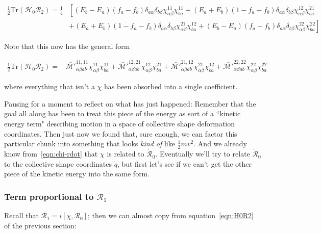 \begin{align}
\frac{1}{2}\mathrm{Tr}\left(\mathcal{H}_0\mathcal{R}_2\right) = \frac{1}{4}
& \left[(E_b-E_a)(f_a-f_b)\delta_{a\alpha}\delta_{b\beta}\chi^{11}_{\alpha\beta}\chi^{11}_{ba} + (E_a+E_b)(1-f_a-f_b)\delta_{a\alpha}\delta_{b\beta}\chi^{12}_{\alpha\beta}\chi^{21}_{ba}\right. \\
&\left.+ (E_a+E_b)(1-f_a-f_b)\delta_{a\alpha}\delta_{b\beta}\chi^{21}_{\alpha\beta}\chi^{12}_{ba} + (E_b-E_a)(f_a-f_b)\delta_{a\alpha}\delta_{b\beta}\chi^{22}_{\alpha\beta}\chi^{22}_{ba}\right]
\end{align}

\noindent Note that this now has the general form

\begin{tcolorbox}
	\begin{align}\label{eqn:H0R2_inertia}
	\frac{1}{2}\mathrm{Tr}\left(\mathcal{H}_0\mathcal{R}_2\right) = &
	\mathcal{\bar{M'}}^{11,11}_{\alpha\beta ab}\chi^{11}_{\alpha\beta}\chi^{11}_{ba} +
	\mathcal{\bar{M'}}^{12,21}_{\alpha\beta ab}\chi^{12}_{\alpha\beta}\chi^{21}_{ba} +
	\mathcal{\bar{M'}}^{21,12}_{\alpha\beta ab}\chi^{21}_{\alpha\beta}\chi^{12}_{ba} +
	\mathcal{\bar{M'}}^{22,22}_{\alpha\beta ab}\chi^{22}_{\alpha\beta}\chi^{22}_{ba}
	\end{align}
\end{tcolorbox}

\noindent where everything that isn't a $\chi$ has been absorbed into a single coefficient.

Pausing for a moment to reflect on what has just happened: Remember that the goal all along has been to treat this piece of the energy as sort of a ``kinetic energy term" describing motion in a space of collective shape deformation coordinates. Then just now we found that, sure enough, we can factor this particular chunk into something that looks \textit{kind of} like $\frac{1}{2}mv^2$. And we already know from~\eqref{eqn:chi-rdot} that $\chi$ is related to $\mathcal{\dot{R}}_0$. Eventually we'll try to relate $\mathcal{\dot{R}}_0$ to the collective shape coordinates $\dot{q}$, but first let's see if we can't get the other piece of the kinetic energy into the same form.

\subsubsection{Term proportional to $\mathcal{R}_1$}

Recall that $\mathcal{R}_1 = i\left[\chi, \mathcal{R}_0\right]$; then we can almost copy from equation~\eqref{eqn:H0R2} of the previous section:

